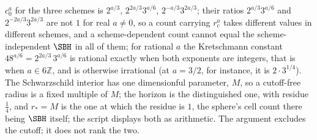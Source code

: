 $c_0^a$ for the three schemes is $2^{a/3}$, $2^{2a/3}3^{a/6}$, $2^{-a/3}3^{2a/3}$; their ratios $2^{a/3}3^{a/6}$ and $2^{-2a/3}3^{2a/3}$ are not $1$ for real $a \neq 0$, so a count carrying $r_c^a$ takes different values in different schemes, and a scheme-dependent count cannot equal the scheme-independent $\SBH$ in all of them; for rational $a$ the Kretschmann constant $48^{a/6} = 2^{2a/3}\,3^{a/6}$ is rational exactly when both exponents are integers, that is when $a \in 6\mathbb{Z}$, and is otherwise irrational (at $a = 3/2$, for instance, it is $2\cdot 3^{1/4}$). The Schwarzschild interior has one dimensionful parameter, $M$, so a cutoff-free radius is a fixed multiple of $M$; the horizon is the distinguished one, with residue $\tfrac14$, and $r_* = M$ is the one at which the residue is $1$, the sphere's cell count there being $\SBH$ itself; the script displays both as arithmetic. The argument excludes the cutoff; it does not rank the two.
